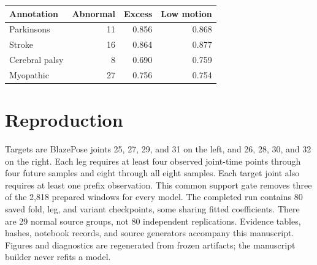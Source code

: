 \documentclass[letterpaper]{article}
\begin{document}
\begin{center}\begin{minipage}{\columnwidth}
\centering
\small
\begin{tabular}{lrrr}
\toprule
Annotation & Abnormal & Excess & Low motion \\
\midrule
Parkinsons & 11 & 0.856 & 0.868 \\
Stroke & 16 & 0.864 & 0.877 \\
Cerebral palsy & 8 & 0.690 & 0.759 \\
Myopathic & 27 & 0.756 & 0.754 \\
\bottomrule
\end{tabular}
\end{minipage}\end{center}

\section{Reproduction}

Targets are BlazePose joints 25, 27, 29, and 31 on the left, and 26, 28, 30, and 32 on the right. Each leg requires at least four observed joint-time points through four future samples and eight through all eight samples. Each target joint also requires at least one prefix observation. This common support gate removes three of the 2,818 prepared windows for every model. The completed run contains 80 saved fold, leg, and variant checkpoints, some sharing fitted coefficients. There are 29 normal source groups, not 80 independent replications. Evidence tables, hashes, notebook records, and source generators accompany this manuscript. Figures and diagnostics are regenerated from frozen artifacts; the manuscript builder never refits a model.
\end{document}
